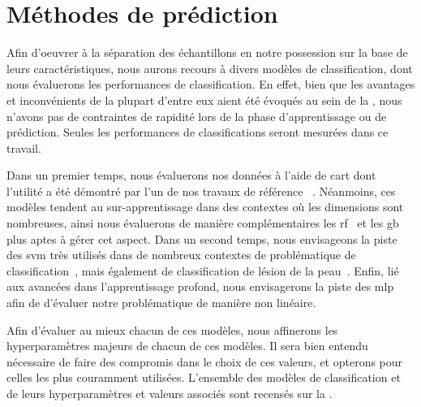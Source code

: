 \section{Méthodes de prédiction}
Afin d'oeuvrer à la séparation des échantillons en notre possession sur la base de leurs caractéristiques, nous aurons recours à divers modèles de classification, dont nous évaluerons les performances de classification. En effet, bien que les avantages et inconvénients de la plupart d'entre eux aient été évoqués au sein de la , nous n'avons pas de contraintes de rapidité lors de la phase d'apprentissage ou de prédiction. Seules les performances de classifications seront mesurées dans ce travail.\par

Dans un premier temps, nous évaluerons nos données à l'aide de \gls{cart} dont l'utilité a été démontré par l'un de nos travaux de référence ~\cite{Wiltgen2008}. Néanmoins, ces modèles tendent au sur-apprentissage dans des contextes où les dimensions sont nombreuses, ainsi nous évaluerons de manière complémentaires les \gls{rf}~\cite{Breiman2001} et les \gls{gb} plus aptes à gérer cet aspect. Dans un second temps, nous envisageons la piste des \gls{svm} très utilisés dans de nombreux contextes de problématique de classification~\cite{Smach2008a}, mais également de classification de lésion de la peau~\cite{Celebi2007}. Enfin, lié aux avancées dans l'apprentissage profond, nous envisagerons la piste des \gls{mlp} afin de d'évaluer notre problématique de manière non linéaire.\par

Afin d'évaluer au mieux chacun de ces modèles, nous affinerons les hyperparamètres majeurs de chacun de ces modèles. Il sera bien entendu nécessaire de faire des compromis dans le choix de ces valeurs, et opterons pour celles les plus couramment utilisées. L'ensemble des modèles de classification et de leurs hyperparamètres et valeurs associés sont recensés sur la .\par

